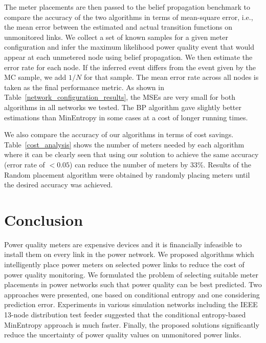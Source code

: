 The meter placements are then passed to the belief propagation benchmark to compare the accuracy of the two algorithms in terms of mean-square error, i.e., the mean error between the estimated and actual transition functions on unmonitored links. We collect a set of known samples for a given meter configuration and infer the maximum likelihood power quality event that would appear at each unmetered node using belief propagation. We then estimate the error rate for each node. If the inferred event differs from the event given by the MC sample, we add $1/N$ for that sample. The mean error rate across all nodes is taken as the final performance metric. As shown in Table~\ref{network_configuration_results}, the MSEs are very small for both algorithms in all networks we tested. The BP algorithm gave slightly better estimations than MinEntropy in some cases at a cost of longer running times.

We also compare the accuracy of our algorithms in terms of cost savings. Table~\ref{cost_analysis} shows the number of meters needed by each algorithm where it can be clearly seen that using our solution to achieve the same accuracy (error rate of $< 0.05$) can reduce the number of meters by 33\%. Results of the Random placement algorithm were obtained by randomly placing meters until the desired accuracy was achieved.


\section{Conclusion}
\label{sec:conclusion}
Power quality meters are expensive devices and it is financially infeasible to install them on every link in the power network. We proposed algorithms which intelligently place power meters on selected power links to reduce the cost of power quality monitoring. We formulated the problem of selecting suitable meter placements in power networks such that power quality can be best predicted. Two approaches were presented, one based on conditional entropy and one considering prediction error. Experiments in various simulation networks including the IEEE 13-node distribution test feeder suggested that the conditional entropy-based MinEntropy approach is much faster. Finally, the proposed solutions significantly reduce the uncertainty of power quality values on unmonitored power links.